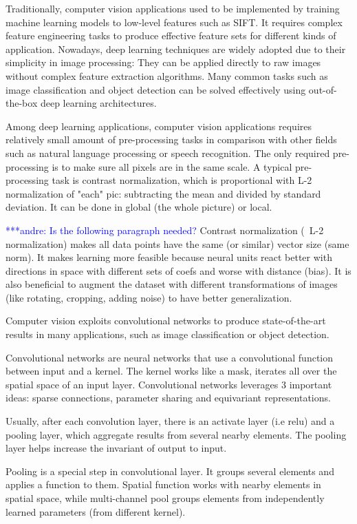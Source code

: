 \documentclass[conference]{IEEEtran}
\newcommand{\alnote}[1]{ {\textcolor{blue} { ***andre: #1 }}}
\newcommand{\alnote}[1]{}
\begin{document}
Traditionally, computer vision applications used to be implemented by training machine learning models to low-level features such as SIFT. It requires complex feature engineering tasks to produce effective feature sets for different kinds of application. Nowadays, deep learning techniques are widely adopted due to their simplicity in image processing: They can be applied directly to raw images without complex feature extraction algorithms. Many common tasks such as image classification and object detection can be solved effectively using out-of-the-box deep learning architectures.

Among deep learning applications, computer vision applications requires relatively small amount of pre-processing tasks in comparison with other fields such as natural language processing or speech recognition. The only required pre-processing is to make sure all pixels are in the same scale. A typical pre-processing task is contrast normalization, which is proportional with L-2 normalization of "each" pic: subtracting the mean and divided by standard deviation. It can be done in global (the whole picture) or local. 

\alnote{Is the following paragraph needed?} Contrast normalization (~L-2 normalization) makes all data points have the same (or similar) vector size (same norm). It makes learning more feasible because neural units react better with directions in space with different sets of coefs and worse with distance (bias). It is also beneficial to augment the dataset with different transformations of images (like rotating, cropping, adding noise) to have better generalization.

Computer vision exploits convolutional networks to produce state-of-the-art results in many applications, such as image classification or object detection.

Convolutional networks are neural networks that use a convolutional function between input and a kernel. The kernel works like a mask, iterates all over the spatial space of an input layer. Convolutional networks leverages 3 important ideas: sparse connections, parameter sharing and equivariant representations.

Usually, after each convolution layer, there is an activate layer (i.e relu) and a pooling layer, which aggregate results from several nearby elements. The pooling layer helps increase the invariant of output to input.

Pooling is a special step in convolutional layer. It groups several elements and applies a function to them. Spatial function works with nearby elements in spatial space, while multi-channel pool groups elements from independently learned parameters (from different kernel).
\end{document}
